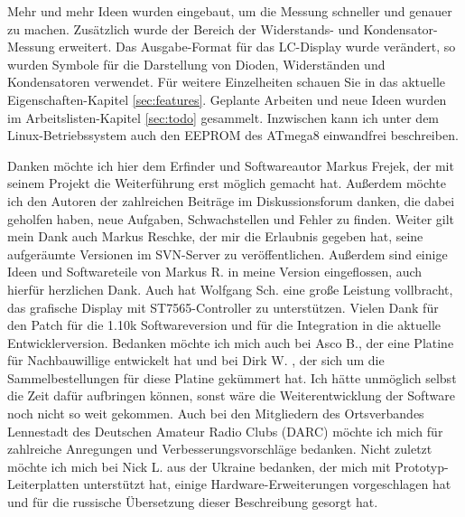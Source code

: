 Mehr und mehr Ideen wurden eingebaut, um die Messung schneller und genauer zu machen.
Zusätzlich wurde der Bereich der Widerstands- und Kondensator-Messung erweitert.
Das Ausgabe-Format für das LC-Display wurde verändert, so wurden Symbole für die Darstellung von
Dioden, Widerständen und Kondensatoren verwendet.
Für weitere Einzelheiten schauen Sie in das aktuelle Eigenschaften-Kapitel \ref{sec:features}.
Geplante Arbeiten und neue Ideen wurden im Arbeitslisten-Kapitel \ref{sec:todo} gesammelt.
Inzwischen kann ich unter dem Linux-Betriebssystem auch den EEPROM des ATmega8 einwandfrei beschreiben.

Danken möchte ich hier dem Erfinder und Softwareautor Markus Frejek, der mit seinem Projekt die Weiterführung erst
möglich gemacht hat.
Außerdem möchte ich den Autoren der zahlreichen Beiträge im Diskussionsforum danken, die dabei geholfen haben, neue Aufgaben, Schwachstellen und
Fehler zu finden. 
Weiter gilt mein Dank auch Markus Reschke, der mir die Erlaubnis gegeben hat, seine aufgeräumte Versionen im
SVN-Server zu veröffentlichen. Außerdem sind einige Ideen und Softwareteile von Markus R. in meine Version eingeflossen,
auch hierfür herzlichen Dank.
Auch hat Wolfgang Sch. eine große Leistung vollbracht, das grafische Display mit ST7565-Controller zu unterstützen.
Vielen Dank für den Patch für die 1.10k Softwareversion und für die Integration in die aktuelle Entwicklerversion.
Bedanken möchte ich mich auch bei Asco B., der eine Platine für Nachbauwillige entwickelt hat und bei Dirk W. , der sich
um die Sammelbestellungen für diese Platine gekümmert hat. Ich hätte unmöglich selbst die Zeit dafür aufbringen können, sonst
wäre die Weiterentwicklung der Software noch nicht so weit gekommen.
Auch bei den Mitgliedern des Ortsverbandes Lennestadt des Deutschen Amateur Radio Clubs (DARC) möchte ich mich für zahlreiche
Anregungen und Verbesserungsvorschläge bedanken.
Nicht zuletzt möchte ich mich bei Nick L. aus der Ukraine bedanken, der mich mit Prototyp-Leiterplatten unterstützt hat,
einige Hardware-Erweiterungen vorgeschlagen hat und für die russische Übersetzung dieser Beschreibung gesorgt hat.


